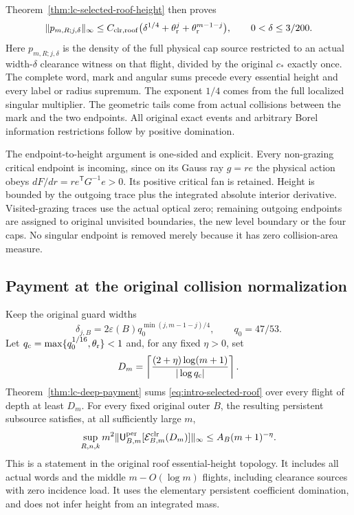 Theorem~\ref{thm:lc-selected-roof-height} then proves
\begin{equation}\label{eq:intro-selected-roof}
 \|p_{m,R;j,\delta}\|_\infty
 \le C_{\rm clr,roof}
       \bigl(\delta^{1/4}+\theta_{\rm r}^{j}
                         +\theta_{\rm r}^{m-1-j}\bigr),
 \qquad 0<\delta\le3/200.
\end{equation}
Here $p_{m,R;j,\delta}$ is the density of the full physical cap
source restricted to an actual width-$\delta$ clearance witness
on that flight, divided by the original $c_*$ exactly once.
The complete word, mark and angular sums precede every essential
height and every label or radius supremum. The exponent $1/4$
comes from the full localized singular multiplier. The geometric
tails come from actual collisions between the mark and the two
endpoints. All original exact events and arbitrary Borel
information restrictions follow by positive domination.

The endpoint-to-height argument is one-sided and explicit.
Every non-grazing critical endpoint is incoming, since on its
Gauss ray $g=re$ the physical action obeys
$dF/dr=r e^{\mathsf T}G^{-1}e>0$.
Its positive critical fan is retained. Height is bounded by the
outgoing trace plus the integrated absolute interior derivative.
Visited-grazing traces use the actual optical zero; remaining
outgoing endpoints are assigned to original unvisited boundaries,
the new level boundary or the four caps. No singular endpoint
is removed merely because it has zero collision-area measure.

\subsection*{Payment at the original collision normalization}
Keep the original guard widths
\[
 \delta_{j,B}=2\varepsilon(B)q_0^{\min(j,m-1-j)/4},
 \qquad q_0=47/53.
\]
Let $q_{\rm c}=\max\{q_0^{1/16},\theta_{\rm r}\}<1$ and,
for any fixed $\eta>0$, set
\[
 D_m=\left\lceil\frac{(2+\eta)\log(m+1)}{|\log q_{\rm c}|}
                                                \right\rceil.
\]
Theorem~\ref{thm:lc-deep-payment} sums
\eqref{eq:intro-selected-roof} over every flight of depth at
least $D_m$. For every fixed original outer $B$, the resulting
persistent subsource satisfies, at all sufficiently large $m$,
\begin{equation}\label{eq:intro-deep-payment}
 \sup_{R,n,k}m^2
 \|\mathsf U_{B,m}^{\rm per}
       [\mathcal E^{\rm clr}_{B,m}(D_m)]\|_\infty
                    \le A_B(m+1)^{-\eta}.
\end{equation}
This is a statement in the original roof essential-height
topology. It includes all actual words and the middle
$m-O(\log m)$ flights, including clearance sources with zero
incidence load. It uses the elementary persistent coefficient
domination, and does not infer height from an integrated mass.

